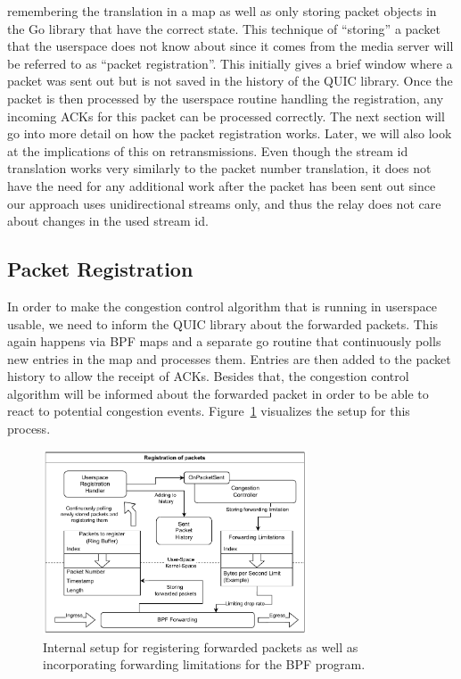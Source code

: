remembering the translation in a map as well as only storing packet objects in the 
Go library that have the correct state.
This technique of ``storing'' a packet that the userspace does not know
about since it comes from the media server will be referred to as ``packet registration''.
This initially gives a brief window where a packet was sent out but is not saved in the history
of the QUIC library.
Once the packet is then processed by the userspace routine handling the 
registration, any incoming ACKs for this packet can be processed correctly.
The next section will go into more detail on how the packet registration works.
Later, we will also look at the implications of this on retransmissions.
Even though the stream id translation works very similarly to the packet number translation, it 
does not have the need for any additional work after the packet has been sent out since our 
approach uses unidirectional streams only, and thus the relay does not care about changes in 
the used stream id. %

\subsection{Packet Registration}
In order to make the congestion control algorithm that is running in userspace
usable, we need to inform the QUIC library about the forwarded packets.
This again happens via BPF maps and a separate go routine that continuously
polls new entries in the map and processes them.
Entries are then added to the packet history to allow the receipt of ACKs.
Besides that, the congestion control algorithm will be informed about the
forwarded packet in order to be able to react to potential congestion events.
Figure~\ref{fig:forward-registration} visualizes the setup for this process.
\vspace{0.5cm}
\begin{figure}[H]
    \centering
    \includegraphics[width=0.7\textwidth]{figures/03_fast_relays/forward-registration.drawio.pdf}
    \caption[Packet registration schematic]{Internal setup for registering forwarded packets as well as incorporating forwarding
    limitations for the BPF program.}\label{fig:forward-registration}
\end{figure}

